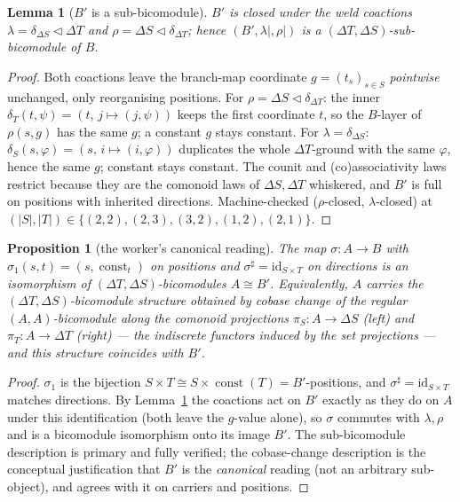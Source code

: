 \documentclass[11pt]{amsart}
\theoremstyle{plain}
\newtheorem{proposition}[theorem]{Proposition}
\newtheorem{lemma}[theorem]{Lemma}
\theoremstyle{definition}
\renewcommand{\lhd}{\triangleleft}
\newcommand{\Store}[1]{\Delta #1}
\DeclareMathOperator{\const}{const}
\begin{document}
\begin{lemma}[$B'$ is a sub-bicomodule]\label{lem:subbicomod}
$B'$ is closed under the weld coactions $\lambda=\delta_{\Store{S}}\lhd\Store{T}$ and
$\rho=\Store{S}\lhd\delta_{\Store{T}}$; hence $(B',\lambda|,\rho|)$ is a
$(\Store{T},\Store{S})$-sub-bicomodule of $B$.
\end{lemma}

\begin{proof}
Both coactions leave the branch-map coordinate $g=(t_s)_{s\in S}$ \emph{pointwise}
unchanged, only reorganising positions. For $\rho=\Store{S}\lhd\delta_{\Store{T}}$: the
inner $\delta_T(t,\psi)=(t,\,j\mapsto(j,\psi))$ keeps the first coordinate $t$, so the
$B$-layer of $\rho(s,g)$ has the same $g$; a constant $g$ stays constant. For
$\lambda=\delta_{\Store{S}}$: $\delta_S(s,\varphi)=(s,\,i\mapsto(i,\varphi))$ duplicates the
whole $\Store{T}$-ground with the same $\varphi$, hence the same $g$; constant stays
constant. The counit and (co)associativity laws restrict because they are the comonoid laws
of $\Store{S},\Store{T}$ whiskered, and $B'$ is full on positions with inherited directions.
Machine-checked ($\rho$-closed, $\lambda$-closed) at
$(|S|,|T|)\in\{(2,2),(2,3),(3,2),(1,2),(2,1)\}$.
\end{proof}

\begin{proposition}[the worker's canonical reading]\label{prop:sigma}
The map $\sigma\colon A\to B$ with $\sigma_1(s,t)=(s,\const_t)$ on positions and
$\sigma^{\sharp}=\mathrm{id}_{S\times T}$ on directions is an isomorphism of
$(\Store{T},\Store{S})$-bicomodules $A\cong B'$. Equivalently, $A$ carries the
$(\Store{T},\Store{S})$-bicomodule structure obtained by cobase change of the regular
$(A,A)$-bicomodule along the comonoid projections $\pi_S\colon A\to\Store{S}$ (left) and
$\pi_T\colon A\to\Store{T}$ (right) --- the indiscrete functors induced by the set
projections --- and this structure coincides with $B'$.
\end{proposition}

\begin{proof}
$\sigma_1$ is the bijection $S\times T\cong S\times\const(T)=B'$-positions, and
$\sigma^{\sharp}=\mathrm{id}_{S\times T}$ matches directions. By Lemma~\ref{lem:subbicomod}
the coactions act on $B'$ exactly as they do on $A$ under this identification (both leave the
$g$-value alone), so $\sigma$ commutes with $\lambda,\rho$ and is a bicomodule isomorphism
onto its image $B'$. The sub-bicomodule description is primary and fully verified; the
cobase-change description is the conceptual justification that $B'$ is the \emph{canonical}
reading (not an arbitrary sub-object), and agrees with it on carriers and positions.
\end{proof}
\end{document}
